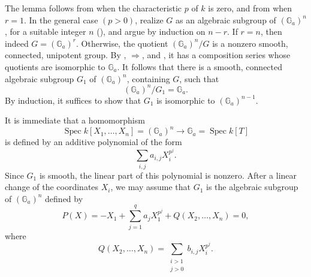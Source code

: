 


The lemma follows from  when the characteristic \(p\) of
\(k\) is zero, and from  when \(r=1\).  In the general case
\((p>0)\), realize \(G\) as an algebraic subgroup of
\((\mathbb G_a)^n\), for a suitable integer \(n\) (), and
argue by induction on \(n-r\).  If \(r=n\), then indeed
\(G=(\mathbb G_a)^r\).  Otherwise, the quotient
\((\mathbb G_a)^n/G\) is a nonzero smooth, connected, unipotent
group.  By , \(\Rightarrow\), and , it has a
composition series whose quotients are isomorphic to
\(\mathbb G_a\).  It follows that there is a smooth, connected
algebraic subgroup \(G_1\) of \((\mathbb G_a)^n\), containing \(G\),
such that
\[
  (\mathbb G_a)^n/G_1=\mathbb G_a.
\]
By induction, it suffices to show that \(G_1\) is isomorphic to
\((\mathbb G_a)^{n-1}\).

It is immediate that a homomorphism
\[
  \operatorname{Spec}k[X_1,\ldots,X_n]=(\mathbb G_a)^n
  \longrightarrow
  \mathbb G_a=\operatorname{Spec}k[T]
\]
is defined by an additive polynomial of the form
\[
  \sum_{i,j}a_{i,j}X_i^{p^j}.
\]
Since \(G_1\) is smooth, the linear part of this polynomial is
nonzero.  After a linear change of the coordinates \(X_i\), we may
assume that \(G_1\) is the algebraic subgroup of
\((\mathbb G_a)^n\) defined by
\[
  \tag{\(*\)}
  P(X)=-X_1+\sum_{j=1}^{q}a_jX_1^{p^j}
    +Q(X_2,\ldots,X_n)=0,
\]
where
\[
  Q(X_2,\ldots,X_n)
    =\sum_{\substack{i>1\\j>0}}b_{i,j}X_i^{p^j}.
\]

